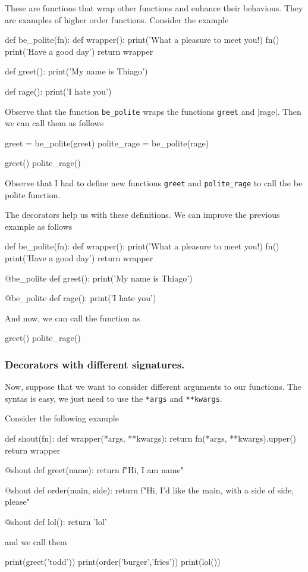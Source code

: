 These are functions that wrap other functions and enhance their behavious. They are examples of higher order functions. Consider the example
\begin{listing}{1}
def be_polite(fn):
    def wrapper():
        print('What a pleasure to meet you!)
        fn()
        print('Have a good day')
    return wrapper 

def greet():
    print('My name is Thiago')    

def rage():
    print('I hate you')
\end{listing}
Observe that the function \verb|be_polite| wraps the functions \verb|greet| and |rage|. Then we can call them as follows
\begin{listingcont}
greet = be_polite(greet)    
polite_rage = be_polite(rage)

greet()
polite_rage()
\end{listingcont}
Observe that I had to define new functions \verb|greet| and \verb|polite_rage| to call the be polite function. 

The decorators help us with these definitions. We can improve the previous example as follows
\begin{listing}{1}
def be_polite(fn):
    def wrapper():
        print('What a pleasure to meet you!)
        fn()
        print('Have a good day')
    return wrapper 

@be_polite    
def greet():
    print('My name is Thiago')    

@be_polite
def rage():
    print('I hate you')
\end{listing}
And now, we can call the function as 
\begin{listingcont}
greet()
polite_rage()
\end{listingcont}

\subsubsection{Decorators with different signatures.}

Now, suppose that we want to consider different arguments to our functions. The syntas is easy, we just need to use the \verb|*args| and \verb|**kwargs|. 

Consider the following example
\begin{listing}{1}
def shout(fn):
    def wrapper(*args, **kwargs):
        return fn(*args, **kwargs).upper()
    return wrapper

@shout 
def greet(name):
    return f"Hi, I am {name}"    

@shout 
def order(main, side):
    return f"Hi, I'd like the {main}, with a side of {side}, please"
    
@shout 
def lol():
    return 'lol'
\end{listing}
and we call them 
\begin{listingcont}
print(greet('todd'))
print(order('burger','fries'))
print(lol())
\end{listingcont}

